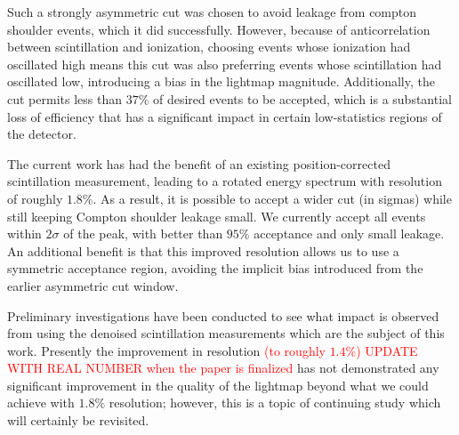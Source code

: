 Such a strongly asymmetric cut was chosen to avoid leakage from compton shoulder events, which it did successfully.  However, because of anticorrelation between scintillation and ionization, choosing events whose ionization had oscillated high means this cut was also preferring events whose scintillation had oscillated low, introducing a bias in the lightmap magnitude.  Additionally, the cut permits less than $37\%$ of desired events to be accepted, which is a substantial loss of efficiency that has a significant impact in certain low-statistics regions of the detector.

The current work has had the benefit of an existing position-corrected scintillation measurement, leading to a rotated energy spectrum with resolution of roughly $1.8\%$.  As a result, it is possible to accept a wider cut (in sigmas) while still keeping Compton shoulder leakage small.  We currently accept all events within $2\sigma$ of the peak, with better than $95\%$ acceptance and only small leakage.  An additional benefit is that this improved resolution allows us to use a symmetric acceptance region, avoiding the implicit bias introduced from the earlier asymmetric cut window.

Preliminary investigations have been conducted to see what impact is observed from using the denoised scintillation measurements which are the subject of this work.  Presently the improvement in resolution \textcolor{red}{(to roughly $1.4\%$) UPDATE WITH REAL NUMBER when the paper is finalized} has not demonstrated any significant improvement in the quality of the lightmap beyond what we could achieve with $1.8\%$ resolution; however, this is a topic of continuing study which will certainly be revisited.

